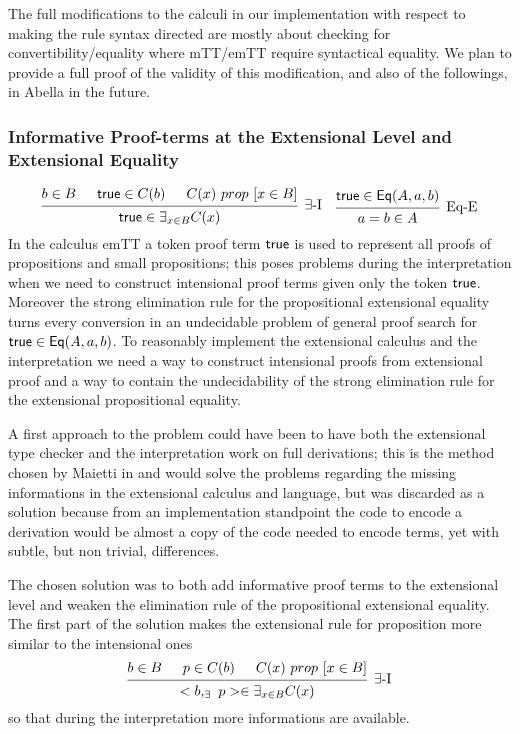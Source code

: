  	The full modifications to the calculi in our implementation with respect to making the rule syntax directed are mostly about checking for convertibility/equality where mTT/emTT require syntactical equality. We plan to provide a full proof of the validity of this modification, and also of the followings, in Abella in the future.
	
	
	\subsubsection{Informative Proof-terms at the Extensional Level and \\ Extensional Equality}
	\[\begin{prooftree}
	\hypo{b\in B}
	\hypo{\s{true} \in C(b)}
	\hypo{C(x)\ prop\ [x \in B]}
	\infer3[\ensuremath{\exists}-\ensuremath{\text{I}}]{\s{true} \in \exists_{x\in B}{C(x)}}
	\end{prooftree}\quad
	\begin{prooftree}
	\hypo{\s{true}\in \s{Eq}(A,a,b)}
	\infer1[Eq-E]{a = b \in A}
	\end{prooftree}\]
	In the calculus emTT a token proof term ${\text{\ensuremath{\mathsf{true}}}}$ is used to represent all proofs of propositions and small propositions; this poses problems during the interpretation when we need to construct intensional proof terms given only the token ${\text{\ensuremath{\mathsf{true}}}}$. Moreover the strong elimination rule for the propositional extensional equality turns every conversion in an undecidable problem of general proof search for ${{\text{\ensuremath{\mathsf{true}}}}\in {\text{\ensuremath{\mathsf{Eq}}}}(A,a,b)}$.
	To reasonably implement the extensional calculus and the interpretation we need a way to construct  intensional proofs from extensional proof and a way to contain the undecidability of the strong elimination rule for the extensional propositional equality.
	
	A first approach to the problem could have been to have both the extensional type checker and the interpretation work on full derivations; this is the method chosen by Maietti in \cite{maietti2009minimalist} and would solve the problems regarding the missing informations in the extensional calculus and language, but was discarded as a solution because from an implementation standpoint the code to encode a derivation would be almost a copy of the code needed to encode terms, yet with subtle, but non trivial, differences.
	
	The chosen solution was to both add informative proof terms to the extensional level and weaken the elimination rule of the propositional extensional equality. The first part of the solution makes the extensional rule for proposition more similar to the intensional ones 
	\[
	\begin{prooftree}
	\hypo{b\in B}
	\hypo{p \in C(b)}
	\hypo{C(x)\ prop\ [x \in B]}
	\infer3[\ensuremath{\exists}-\ensuremath{\text{I}}]{<b,_{\exists}\  p> \in \exists_{x\in B}{C(x)}}
	\end{prooftree}
	\]
	so that during the interpretation more informations are available.
	
